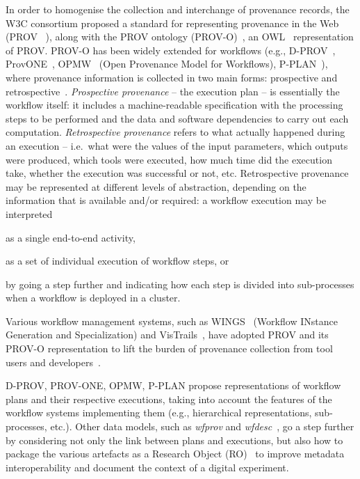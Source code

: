 \documentclass[10pt,letterpaper]{article}
\begin{document}
In order to homogenise the collection and interchange of provenance records, the W3C consortium proposed a standard for representing provenance in the Web (PROV ~\cite{Moreau 2013}), along with the PROV ontology (PROV-O)~\cite{Lebo 2013}, an OWL~\cite{W3C OWL Working Group 2012} representation of PROV. %
PROV-O has been widely extended for workflows (e.g., D-PROV~\cite{Missier 2013}, ProvONE~\cite{Cuevas-Vicenttin 2016}, OPMW~\cite{Garijo 2011} (Open Provenance Model for Workflows), P-PLAN~\cite{Garijo 2012}), where provenance information is collected in two main forms: prospective and retrospective~\cite{Freire 2008}. \emph{Prospective provenance} -- the execution plan -- is essentially the workflow itself: it includes a machine-readable specification with the processing steps to be performed and the data and software dependencies to carry out each computation.
\emph{Retrospective provenance} refers to what actually happened during an execution -- i.e.~what were the values of the input parameters, which outputs were produced, which tools were executed, how much time did the execution take, whether the execution was successful or not, etc.
Retrospective provenance may be represented at different levels of abstraction, depending on the information that is available and/or required: a workflow execution may be interpreted
\begin{inlineenum}
\item as a single end-to-end activity,
\item as a set of individual execution of workflow steps, or
\item by going a step further and indicating how each step is divided into sub-processes when a workflow is deployed in a cluster.
\end{inlineenum}
Various workflow management systems, such as WINGS~\cite{Gil 2011} (Workflow INstance Generation and Specialization) and VisTrails~\cite{Scheidegger 2008,Costa 2013}, have adopted PROV and its PROV-O representation  to lift the burden of provenance collection from tool users and developers~\cite{Atkinson 2017,Perez 2018}.

D-PROV, PROV-ONE, OPMW, P-PLAN propose representations of workflow plans and their respective executions, taking into account the features of the workflow systems implementing them (e.g., hierarchical representations, sub-processes, etc.).
Other data models, such as \emph{wfprov} and \emph{wfdesc}~\cite{Belhajjame 2015}, go a step further by considering not only the link between plans and executions, but also how to package the various artefacts as a Research Object (RO)~\cite{Bechhofer 2013} to improve metadata interoperability and document the context of a digital experiment.
\end{document}
